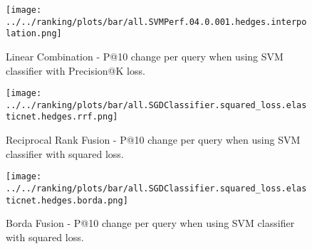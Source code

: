 \begin{table}
\centering
\caption{Absolute P@10 percent improvements per intent type for each of the four query runs
(Summaries 2014, Descriptions 2014, Summaries 2015, Descriptions 2015), when using weighted \textbf{Linear Combination}
for fusing the baseline relevance scores with the classifier scores.
The classifier is SVM with Precision@K loss.}
\label{change-per-query-table-lincomb}
\end{table}

\begin{figure}
\centerline{
  \texttt{[image: ../../ranking/plots/bar/all.SVMPerf.04.0.001.hedges.interpolation.png]}
  }
  \caption{Linear Combination - P@10 change per query when using SVM classifier with Precision@K loss.}
  \label{interp-query}
\end{figure}

\begin{figure}
\centerline{
  \texttt{[image: ../../ranking/plots/bar/all.SGDClassifier.squared\_loss.elasticnet.hedges.rrf.png]}
  }
  \caption{Reciprocal Rank Fusion - P@10 change per query when using SVM classifier with squared loss.}
  \label{rrf-query}
\end{figure}

\begin{figure}
\centerline{
  \texttt{[image: ../../ranking/plots/bar/all.SGDClassifier.squared\_loss.elasticnet.hedges.borda.png]}
  }
  \caption{Borda Fusion - P@10 change per query when using SVM classifier with squared loss.}
  \label{borda-query}
\end{figure}


